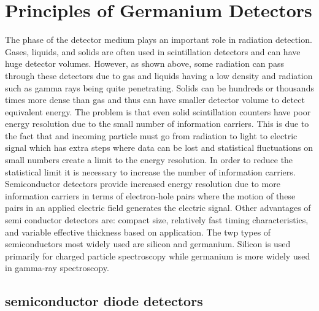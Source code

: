 \chapter{Principles of Germanium Detectors}
The phase of the detector medium plays an important role in radiation detection.
Gases, liquids, and solids are often used in scintillation detectors and can have huge detector volumes.
However, as shown above, some radiation can pass through these detectors due to gas and liquids having a low density and radiation such as gamma rays being quite penetrating.
Solids can be hundreds or thousands times more dense than gas and thus can have smaller detector volume to detect equivalent energy.
The problem is that even solid scintillation counters have poor energy resolution due to the small number of information carriers.
This is due to the fact that and incoming particle must go from radiation to light to electric signal which has extra steps where data can be lost and statistical fluctuations on small numbers create a limit to the energy resolution.
In order to reduce the statistical limit it is necessary to increase the number of information carriers.
Semiconductor detectors provide increased energy resolution due to more information carriers in terms of electron-hole pairs where the motion of these pairs in an applied electric field generates the electric signal.
Other advantages of semi conductor detectors are: compact size, relatively fast timing characteristics, and variable effective thickness based on application.
The twp types of semiconductors most widely used are silicon and germanium.
Silicon is used primarily for charged particle spectroscopy while germanium is more widely used in gamma-ray spectroscopy.

\section{semiconductor diode detectors} 

